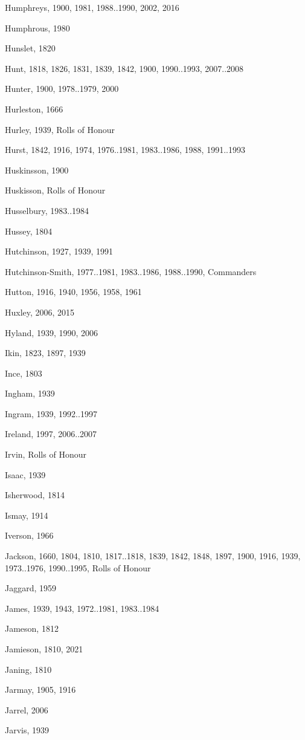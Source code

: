 {\begin{theindex}
\item Humphreys, 1900, 1981, 1988..1990, 2002, 2016
\item Humphrous, 1980
\item Hunslet, 1820
\item Hunt, 1818, 1826, 1831, 1839, 1842, 1900, 1990..1993, 2007..2008
\item Hunter, 1900, 1978..1979, 2000
\item Hurleston, 1666
\item Hurley, 1939, Rolls of Honour
\item Hurst, 1842, 1916, 1974, 1976..1981, 1983..1986, 1988, 1991..1993
\item Huskinsson, 1900
\item Huskisson, Rolls of Honour
\item Husselbury, 1983..1984
\item Hussey, 1804
\item Hutchinson, 1927, 1939, 1991
\item Hutchinson-Smith, 1977..1981, 1983..1986, 1988..1990, Commanders
\item Hutton, 1916, 1940, 1956, 1958, 1961
\item Huxley, 2006, 2015
\item Hyland, 1939, 1990, 2006
\item Ikin, 1823, 1897, 1939
\item Ince, 1803
\item Ingham, 1939
\item Ingram, 1939, 1992..1997
\item Ireland, 1997, 2006..2007
\item Irvin, Rolls of Honour
\item Isaac, 1939
\item Isherwood, 1814
\item Ismay, 1914
\item Iverson, 1966
\item Jackson, 1660, 1804, 1810, 1817..1818, 1839, 1842, 1848, 1897, 1900, 1916, 1939, 1973..1976, 1990..1995, Rolls of Honour
\item Jaggard, 1959
\item James, 1939, 1943, 1972..1981, 1983..1984
\item Jameson, 1812
\item Jamieson, 1810, 2021
\item Janing, 1810
\item Jarmay, 1905, 1916
\item Jarrel, 2006
\item Jarvis, 1939

\end{theindex}}

